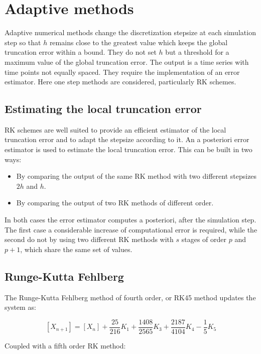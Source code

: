 \section{Adaptive methods}
Adaptive numerical methods change the discretization stepsize at each simulation step so that $h$ remains close to the greatest value which keeps the global truncation error within a bound.
They do not set $h$ but a threshold for a maximum value of the global truncation error.
The output is a time series with time points not equally spaced.
They require the implementation of an error estimator.
Here one step methods are considered, particularly RK schemes.

  \subsection{Estimating the local truncation error}
  RK schemes are well suited to provide an efficient estimator of the local truncation error and to adapt the stepsize according to it.
  An a posteriori error estimator is used to estimate the local truncation error.
  This can be built in two ways:

  \begin{multicols}{2}
    \begin{itemize}
      \item By comparing the output of the same RK method with two different stepsizes $2h$ and $h$.
      \item By comparing the output of two RK methods of different order.
    \end{itemize}
  \end{multicols}

  In both cases the error estimator computes a posteriori, after the simulation step.
  The first case a considerable increase of computational error is required, while the second do not by using two different RK methods with $s$ stages of order $p$ and $p+1$, which share the same set of values.

  \subsection{Runge-Kutta Fehlberg}
  The Runge-Kutta Fehlberg method of fourth order, or RK45 method updates the system as:

  $$[X_{n+1}] = [X_n] + \frac{25}{216}K_1+\frac{1408}{2565}K_3+\frac{2187}{4104}K_4-\frac{1}{5}K_5$$

  Coupled with a fifth order RK method:


